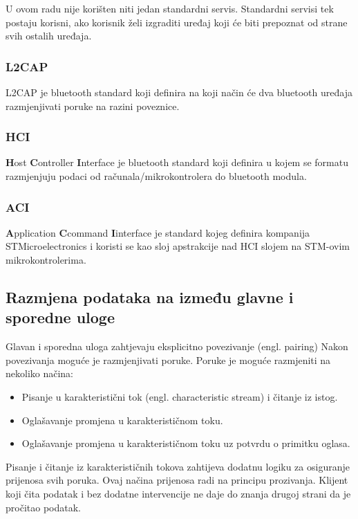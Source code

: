 \documentclass[times, utf8, diplomski]{diplomski}
\begin{document}
U ovom radu nije korišten niti jedan standardni servis. Standardni servisi tek postaju korisni, ako korisnik želi izgraditi uređaj koji će biti prepoznat od strane svih ostalih uređaja.

\subsubsection{L2CAP}
L2CAP je bluetooth standard koji definira na koji način će dva bluetooth uređaja razmjenjivati poruke na razini poveznice.

\subsubsection{HCI}
\textbf{H}ost \textbf{C}ontroller \textbf{I}nterface je bluetooth standard koji definira u kojem se formatu razmjenjuju podaci od računala/mikrokontrolera do bluetooth modula.

\subsubsection{ACI}
\textbf{A}pplication \textbf{C}command \textbf{I}interface je standard kojeg definira kompanija STMicroelectronics i koristi se kao sloj apstrakcije nad HCI slojem na STM-ovim mikrokontrolerima.


\subsection {Razmjena podataka na između glavne i sporedne uloge}
Glavan i sporedna uloga zahtjevaju eksplicitno povezivanje (engl. pairing) Nakon povezivanja moguće je razmjenjivati poruke. Poruke je moguće razmjeniti na nekoliko načina:

\begin{itemize}
  \item Pisanje u karakteristični tok (engl. characteristic stream) i čitanje iz istog.
  \item Oglašavanje promjena u karakterističnom toku.
  \item Oglašavanje promjena u karakterističnom toku uz potvrdu o primitku oglasa.
\end{itemize}

Pisanje i čitanje iz karakterističnih tokova zahtijeva dodatnu logiku za osiguranje prijenosa svih poruka. Ovaj načina prijenosa radi na principu prozivanja. Klijent koji čita podatak i bez dodatne intervencije ne daje do znanja drugoj strani da je pročitao podatak.
\end{document}
